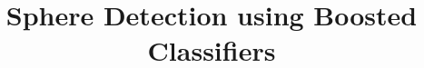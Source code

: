 \documentclass{sig-alternate-05-2015}
\begin{document}
	\title{Sphere Detection using Boosted Classifiers}
\end{document}
